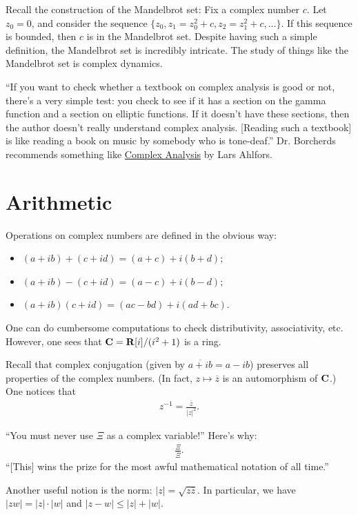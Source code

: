 \documentclass[11pt, oneside,margin=1in]{article}
\begin{document}
Recall the construction of the Mandelbrot set: Fix a complex number $c$. Let $z_0=0$, and consider the sequence $\{z_0, z_1 = z_0^2 + c, z_2 = z_1^2 + c,\hdots\}$. If this sequence is bounded, then $c$ is in the Mandelbrot set. Despite having such a simple definition, the Mandelbrot set is incredibly intricate. The study of things like the Mandelbrot set is complex dynamics.

``If you want to check whether a textbook on complex analysis is good or not, there's a very simple test: you check to see if it has a section on the gamma function and a section on elliptic functions. If it doesn't have these sections, then the author doesn't really understand complex analysis. [Reading such a textbook] is like reading a book on music by somebody who is tone-deaf.'' Dr. Borcherds recommends something like \underline{Complex Analysis} by Lars Ahlfors. 

\section{Arithmetic}
Operations on complex numbers are defined in the obvious way:
\begin{itemize}
	\item $(a+ib) +  (c+id) =  (a+c) + i (b+d)$;
	\item $(a+ib) - (c+id) =  (a-c) + i (b-d)$;
	\item $(a+ib) (c+id) =  (ac - bd) + i (ad + bc)$.
\end{itemize}

One can do cumbersome computations to check distributivity, associativity, etc. However, one sees that $\mathbf C = \mathbf R[i]/(i^2+1)$ is a ring.

Recall that complex conjugation (given by $\overline{a+ib} = a-ib$) preserves all properties of the complex numbers. (In fact, $z\mapsto \overline{z}$ is an automorphism of $\mathbf C$.) One notices that 
\begin{align*}
	z^{-1} = \frac{\overline{z}}{\left\lvert z \right\rvert ^2}.
\end{align*}

``You must never use $\Xi$ as a complex variable!'' Here's why:
\begin{align*}
	\frac{\Xi}{\overline{\Xi}}.
\end{align*}
``[This] wins the prize for the most awful mathematical notation of all time.'' %

Another useful notion is the norm: $\left\lvert z \right\rvert =\sqrt{z\overline{z}} $. In particular, we have $\left\lvert zw \right\rvert = \left\lvert z \right\rvert \cdot \left\lvert w \right\rvert$ and $\left\lvert z-w \right\rvert \le \left\lvert z \right\rvert +\left\lvert w \right\rvert $.
\end{document}
